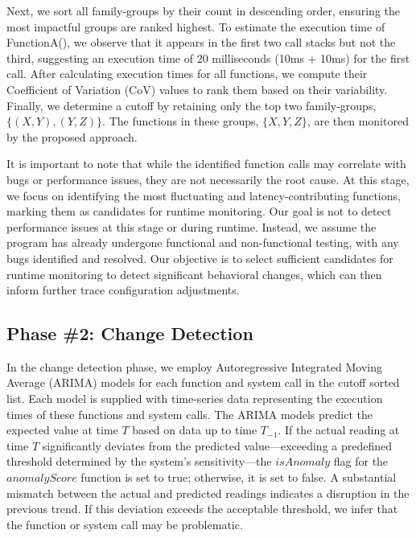 \documentclass[pdflatex,sn-nature]{sn-jnl}%
\theoremstyle{thmstyleone}%
\theoremstyle{thmstyletwo}%
\theoremstyle{thmstylethree}%
\begin{document}
Next, we sort all family-groups by their count in descending order, ensuring the most impactful groups are ranked highest. To estimate the execution time of FunctionA(), we observe that it appears in the first two call stacks but not the third, suggesting an execution time of 20 milliseconds (10ms + 10ms) for the first call. After calculating execution times for all functions, we compute their Coefficient of Variation (CoV) values to rank them based on their variability. Finally, we determine a cutoff by retaining only the top two family-groups, $\{(X,Y),(Y,Z)\}$. The functions in these groups, $\{X,Y,Z\}$, are then monitored by the proposed approach.

It is important to note that while the identified function calls may correlate with bugs or performance issues, they are not necessarily the root cause. At this stage, we focus on identifying the most fluctuating and latency-contributing functions, marking them as candidates for runtime monitoring. Our goal is not to detect performance issues at this stage or during runtime. Instead, we assume the program has already undergone functional and non-functional testing, with any bugs identified and resolved. Our objective is to select sufficient candidates for runtime monitoring to detect significant behavioral changes, which can then inform further trace configuration adjustments.


\subsection{Phase \#2: Change Detection}

In the change detection phase, we employ Autoregressive Integrated Moving Average (ARIMA) models \cite{ho1998use} for each function and system call in the cutoff sorted list. Each model is supplied with time-series data representing the execution times of these functions and system calls. The ARIMA models predict the expected value at time $T$ based on data up to time $T_{-1}$. If the actual reading at time $T$ significantly deviates from the predicted value—exceeding a predefined threshold determined by the system's sensitivity—the $isAnomaly$ flag for the $anomalyScore$ function is set to true; otherwise, it is set to false. A substantial mismatch between the actual and predicted readings indicates a disruption in the previous trend. If this deviation exceeds the acceptable threshold, we infer that the function or system call may be problematic.
\end{document}
